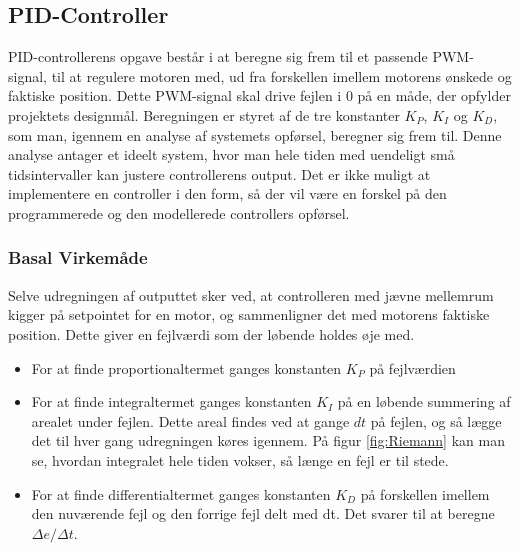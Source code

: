 \subsection{PID-Controller}

PID-controllerens opgave består i at beregne sig frem til et passende PWM-signal, til at regulere motoren med, ud fra forskellen imellem motorens ønskede og faktiske position. Dette PWM-signal skal drive fejlen i 0 på en måde, der opfylder projektets designmål. Beregningen er styret af de tre konstanter $K_{P}$, $K_{I}$ og $K_{D}$, som man, igennem en analyse af systemets opførsel, beregner sig frem til. Denne analyse antager et ideelt system, hvor man hele tiden med uendeligt små tidsintervaller kan justere controllerens output. Det er ikke muligt at implementere en controller i den form, så der vil være en forskel på den programmerede og den modellerede controllers opførsel.


\subsubsection{Basal Virkemåde}

Selve udregningen af outputtet sker ved, at controlleren med jævne mellemrum kigger på setpointet for en motor, og sammenligner det med motorens faktiske position. Dette giver en fejlværdi som der løbende holdes øje med. 
\begin{itemize}
\item For at finde proportionaltermet ganges konstanten $K_{P}$ på fejlværdien
\item For at finde integraltermet ganges konstanten $K_{I}$ på en løbende summering af arealet under fejlen. Dette areal findes ved at gange $dt$ på fejlen, og så lægge det til hver gang udregningen køres igennem. På figur \ref{fig:Riemann} kan man se, hvordan integralet hele tiden vokser, så længe en fejl er til stede.
\item For at finde differentialtermet ganges konstanten $K_{D}$ på forskellen imellem den nuværende fejl og den forrige fejl delt med dt. Det svarer til at beregne $\Delta e/\Delta t$.
\end{itemize}

